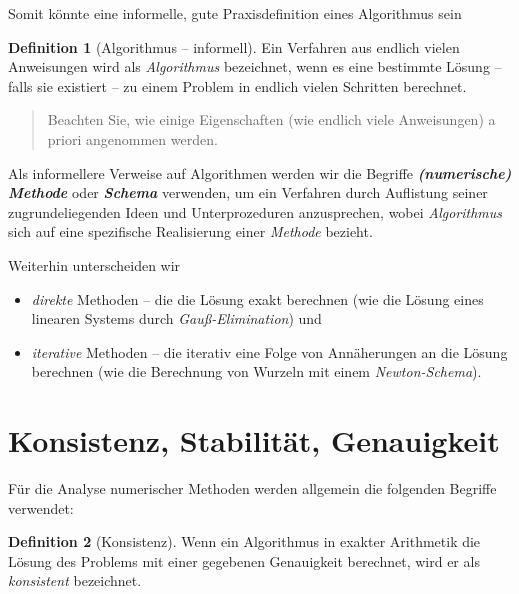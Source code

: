 \documentclass[
]{book}
\providecommand{\tightlist}{%
  \setlength{\itemsep}{0pt}\setlength{\parskip}{0pt}}
\newenvironment {JHSAYS} [0] {\begin{quote}\color{jhsc}} {\end{quote}}
\theoremstyle{definition}
\newtheorem{definition}{Definition}[chapter]
\theoremstyle{definition}
\theoremstyle{definition}
\theoremstyle{definition}
\theoremstyle{remark}
\begin{document}
Somit könnte eine informelle, gute Praxisdefinition eines Algorithmus sein

\begin{definition}[Algorithmus -- informell]
\protect\hypertarget{def:info-algorithm}{}\label{def:info-algorithm}Ein Verfahren aus endlich vielen Anweisungen wird als \emph{Algorithmus} bezeichnet, wenn es eine bestimmte Lösung -- falls sie existiert -- zu einem Problem in endlich vielen Schritten berechnet.
\end{definition}

\leavevmode\hypertarget{rem-algo-annahmen}{}%
\begin{JHSAYS}
Beachten Sie, wie einige Eigenschaften (wie endlich viele Anweisungen) a priori angenommen werden.

\end{JHSAYS}

Als informellere Verweise auf Algorithmen werden wir die Begriffe \textbf{\emph{(numerische) Methode}} oder \textbf{\emph{Schema}} verwenden, um ein Verfahren durch Auflistung seiner zugrundeliegenden Ideen und Unterprozeduren anzusprechen, wobei \emph{Algorithmus} sich auf eine spezifische Realisierung einer \emph{Methode} bezieht.

Weiterhin unterscheiden wir

\begin{itemize}
\tightlist
\item
  \emph{direkte} Methoden -- die die Lösung exakt berechnen (wie die Lösung eines linearen Systems durch \emph{Gauß-Elimination}) und
\item
  \emph{iterative} Methoden -- die iterativ eine Folge von Annäherungen an die Lösung berechnen (wie die Berechnung von Wurzeln mit einem \emph{Newton-Schema}).
\end{itemize}

\hypertarget{konsistenz-stabilituxe4t-genauigkeit}{%
\section{Konsistenz, Stabilität, Genauigkeit}\label{konsistenz-stabilituxe4t-genauigkeit}}

Für die Analyse numerischer Methoden werden allgemein die folgenden Begriffe verwendet:

\begin{definition}[Konsistenz]
\protect\hypertarget{def:consistency}{}\label{def:consistency}Wenn ein Algorithmus in exakter Arithmetik die Lösung des Problems mit einer gegebenen Genauigkeit berechnet, wird er als \emph{konsistent} bezeichnet.
\end{definition}
\end{document}
